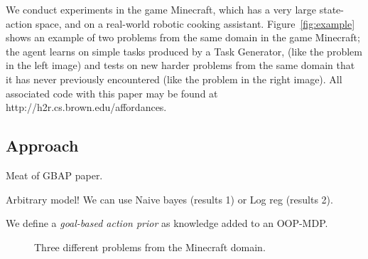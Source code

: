\documentclass[11pt]{article}
\begin{document}
We conduct experiments in
the game Minecraft, which has a very large state-action space, and on
a real-world robotic cooking assistant.  Figure~\ref{fig:example}
shows an example of two problems from the same domain in the game
Minecraft; the agent learns on simple tasks produced by a Task Generator,
(like the problem in the left image) and tests
on new harder problems from the same domain that it has never previously
encountered (like the problem in the right image). All associated code with this paper may be found at
http://h2r.cs.brown.edu/affordances.



\subsection{Approach}
Meat of GBAP paper.

Arbitrary model! We can use Naive bayes (results 1) or Log reg (results 2).

We define a {\it goal-based action prior} as knowledge added to an OOP-MDP.

\begin{figure}[t]
\centering
{}
  \caption{Three different problems from the Minecraft domain.}
  \label{fig:minecraft}
\end{figure}
\end{document}
